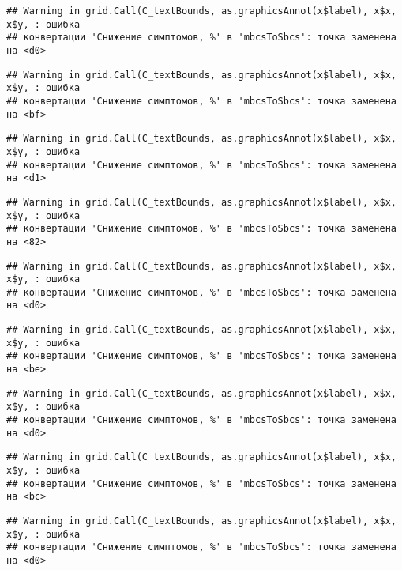 \documentclass[
]{article}
\begin{document}
\begin{verbatim}
## Warning in grid.Call(C_textBounds, as.graphicsAnnot(x$label), x$x, x$y, : ошибка
## конвертации 'Снижение симптомов, %' в 'mbcsToSbcs': точка заменена на <d0>
\end{verbatim}

\begin{verbatim}
## Warning in grid.Call(C_textBounds, as.graphicsAnnot(x$label), x$x, x$y, : ошибка
## конвертации 'Снижение симптомов, %' в 'mbcsToSbcs': точка заменена на <bf>
\end{verbatim}

\begin{verbatim}
## Warning in grid.Call(C_textBounds, as.graphicsAnnot(x$label), x$x, x$y, : ошибка
## конвертации 'Снижение симптомов, %' в 'mbcsToSbcs': точка заменена на <d1>
\end{verbatim}

\begin{verbatim}
## Warning in grid.Call(C_textBounds, as.graphicsAnnot(x$label), x$x, x$y, : ошибка
## конвертации 'Снижение симптомов, %' в 'mbcsToSbcs': точка заменена на <82>
\end{verbatim}

\begin{verbatim}
## Warning in grid.Call(C_textBounds, as.graphicsAnnot(x$label), x$x, x$y, : ошибка
## конвертации 'Снижение симптомов, %' в 'mbcsToSbcs': точка заменена на <d0>
\end{verbatim}

\begin{verbatim}
## Warning in grid.Call(C_textBounds, as.graphicsAnnot(x$label), x$x, x$y, : ошибка
## конвертации 'Снижение симптомов, %' в 'mbcsToSbcs': точка заменена на <be>
\end{verbatim}

\begin{verbatim}
## Warning in grid.Call(C_textBounds, as.graphicsAnnot(x$label), x$x, x$y, : ошибка
## конвертации 'Снижение симптомов, %' в 'mbcsToSbcs': точка заменена на <d0>
\end{verbatim}

\begin{verbatim}
## Warning in grid.Call(C_textBounds, as.graphicsAnnot(x$label), x$x, x$y, : ошибка
## конвертации 'Снижение симптомов, %' в 'mbcsToSbcs': точка заменена на <bc>
\end{verbatim}

\begin{verbatim}
## Warning in grid.Call(C_textBounds, as.graphicsAnnot(x$label), x$x, x$y, : ошибка
## конвертации 'Снижение симптомов, %' в 'mbcsToSbcs': точка заменена на <d0>
\end{verbatim}
\end{document}
